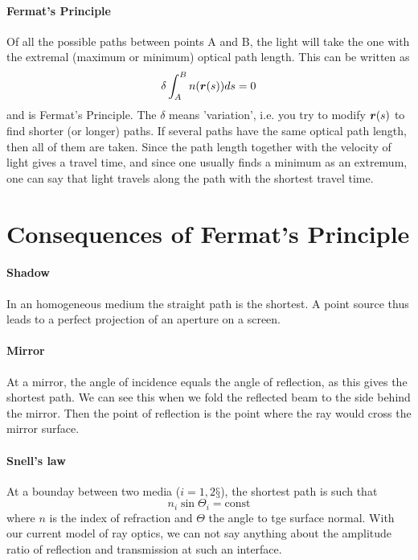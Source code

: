 \paragraph*{Fermat's Principle} Of all the possible paths between points A and B, the light will take the one with the extremal (maximum or minimum) optical path length. This can be written as
\begin{equation}
    \delta \int_A^B n(\boldsymbol{r}(s)) ds  = 0
\end{equation}
and is Fermat's Principle. The $\delta$ means 'variation', i.e. you try to modify $\boldsymbol{r}(s)$ to find shorter (or longer) paths. If several paths have the same optical path length, then all of them are taken. Since the path length together with the velocity of light gives a travel time, and since one usually finds a minimum as an extremum, one can say that light travels along the path with the shortest travel time.

\section{Consequences of Fermat's Principle}
  
\paragraph*{Shadow} In an homogeneous medium the straight path is the shortest. A point source thus leads to a perfect projection of an aperture on a screen. 

\paragraph*{Mirror} At a mirror, the angle of incidence equals the angle of reflection, as this gives the shortest path. We can see this when we fold the reflected beam to the side behind the mirror. Then the point of reflection is the point where the ray would cross the mirror surface.


\paragraph*{Snell's law} At a bounday between two media ($i=1,2§$), the shortest path is such  that 
\begin{equation}
    n_i \sin \Theta_i = \text{const}
\end{equation}
where $n$ is the index of refraction and $\Theta$ the angle to tge surface normal. With our current model of ray optics, we can not say anything about the amplitude ratio of reflection and transmission at such an interface.


